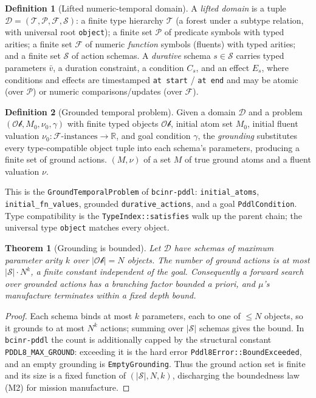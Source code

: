 \documentclass[11pt,oneside]{book}
\theoremstyle{definition}
\newtheorem{definition}{Definition}[chapter]
\theoremstyle{plain}
\newtheorem{theorem}{Theorem}[chapter]
\theoremstyle{remark}
\newcommand{\muop}{\mu}                        %
\newcommand{\code}[1]{\texttt{#1}}
\begin{document}
\begin{definition}[Lifted numeric-temporal domain]\label{def:domain}
A \emph{lifted domain} is a tuple $\mathcal{D}=(\mathcal{T},\mathcal{P},\mathcal{F},
\mathcal{S})$: a finite type hierarchy $\mathcal{T}$ (a forest under a subtype relation, with
universal root \code{object}); a finite set $\mathcal{P}$ of predicate symbols with typed
arities; a finite set $\mathcal{F}$ of numeric \emph{function} symbols (fluents) with typed
arities; and a finite set $\mathcal{S}$ of action schemas. A \emph{durative} schema
$s\in\mathcal{S}$ carries typed parameters $\bar v$, a duration constraint, a condition
$C_s$, and an effect $E_s$, where conditions and effects are timestamped \code{at start} /
\code{at end} and may be atomic (over $\mathcal{P}$) or numeric comparisons/updates (over
$\mathcal{F}$).
\end{definition}

\begin{definition}[Grounded temporal problem]\label{def:ground}
Given a domain $\mathcal{D}$ and a problem $(\mathcal{Ob},M_0,\nu_{0},\gamma)$ with
finite typed objects $\mathcal{Ob}$, initial atom set $M_0$, initial fluent valuation
$\nu_{0}:\mathcal{F}\text{-instances}\to\mathbb{R}$, and goal condition $\gamma$, the
\emph{grounding} substitutes every type-compatible object tuple into each schema's parameters,
producing a finite set of ground actions.%
$(M,\nu)$ of a set $M$ of true ground atoms and a fluent valuation $\nu$.%
\end{definition}

This is the \code{GroundTemporalProblem} of \code{bcinr-pddl}: \code{initial\_atoms},
\code{initial\_fn\_values}, grounded \code{durative\_actions}, and a goal
\code{PddlCondition}. Type compatibility is the \code{TypeIndex::satisfies} walk up the parent
chain; the universal type \code{object} matches every object.

\begin{theorem}[Grounding is bounded]\label{thm:bounded-ground}
Let $\mathcal{D}$ have schemas of maximum parameter arity $k$ over $|\mathcal{Ob}|=N$ objects.
The number of ground actions is at most $|\mathcal{S}|\cdot N^{k}$, a finite constant
independent of the goal. Consequently a forward search over grounded actions has a branching
factor bounded a priori, and $\muop$'s manufacture terminates within a fixed depth bound.
\end{theorem}

\begin{proof}
Each schema binds at most $k$ parameters, each to one of $\le N$ objects, so it grounds to at
most $N^{k}$ actions; summing over $|\mathcal{S}|$ schemas gives the bound. In \code{bcinr-pddl}
the count is additionally capped by the structural constant \code{PDDL8\_MAX\_GROUND}: exceeding
it is the hard error \code{Pddl8Error::BoundExceeded}, and an empty grounding is
\code{EmptyGrounding}. Thus the ground action set is finite and its size is a fixed function of
$(|\mathcal{S}|,N,k)$, discharging the boundedness law (M2) for mission manufacture. \end{proof}
\end{document}
